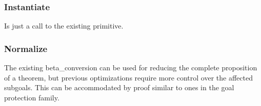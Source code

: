 \subsubsection{Instantiate} Is just a call to the existing primitive.
\subsubsection{Normalize} The existing beta\_conversion can be used for reducing the complete proposition of a theorem, but previous optimizations require more control over the affected subgoals. This can be accommodated by proof similar to ones in the goal protection family.